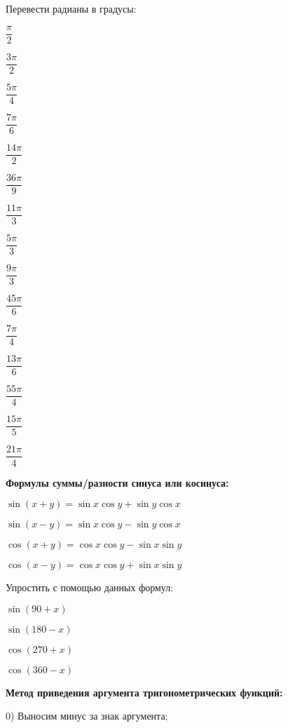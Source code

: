\begin{listofex}
		\item Перевести радианы в градусы:
		\begin{enumcols}[itemcolumns=5]
			\item \( \dfrac{\pi}{2} \)
			\item \( \dfrac{3\pi}{2} \)
			\item \( \dfrac{5\pi}{4} \)
			\item \( \dfrac{7\pi}{6} \)
			\item \( \dfrac{14\pi}{2} \)
			\item \( \dfrac{36\pi}{9} \)
			\item \( \dfrac{11\pi}{3} \)
			\item \( \dfrac{5\pi}{3} \)
			\item \( \dfrac{9\pi}{3} \)
			\item \( \dfrac{45\pi}{6} \)
			\item \( \dfrac{7\pi}{4} \)
			\item \( \dfrac{13\pi}{6} \)
			\item \( \dfrac{55\pi}{4} \)
			\item \( \dfrac{15\pi}{5} \)
			\item \( \dfrac{21\pi}{4} \)
		\end{enumcols}
	\item \textbf{Формулы суммы/разности синуса или косинуса:}
	\begin{enumcols}[itemcolumns=2]
		\item \( \sin(x+y)=\sin x\cos y + \sin y \cos x \)
		\item \( \sin(x-y)=\sin x\cos y - \sin y \cos x \)
		\item \( \cos(x+y)=\cos x \cos y - \sin x \sin y \)
		\item \( \cos(x-y)=\cos x \cos y + \sin x \sin y \)
	\end{enumcols}
	\item Упростить с помощью данных формул:
	\begin{enumcols}[itemcolumns=4]
		\item \( \sin(90+x)\)
		\item \( \sin(180-x)\)
		\item \( \cos(270+x)\)
		\item \( \cos(360-x)\)
	\end{enumcols}
	\item \textbf{Метод приведения аргумента тригонометрических функций:}
	\begin{enumcols}
		\item[0)] Выносим минус за знак аргумента;

\end{enumcols}
\end{listofex}
